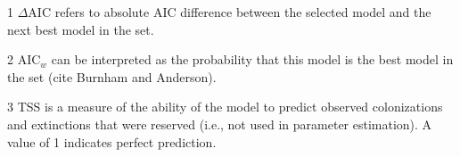 \begin{table}[tb]
\begin{threeparttable}
\begin{tabular}{llllll}
\bottomrule
\end{tabular}
\begin{tablenotes}
\item [1] $\Delta$AIC refers to absolute AIC difference between the selected model and the next best model in the set.
\item [2] AIC$_w$ can be interpreted as the probability that this model is the best model in the set (cite Burnham and Anderson).
\item [3] TSS is a measure of the ability of the model to predict observed colonizations and extinctions that were reserved (i.e., not used in parameter estimation). A value of 1 indicates perfect prediction.
\end{tablenotes}
\end{threeparttable}
\end{table}
